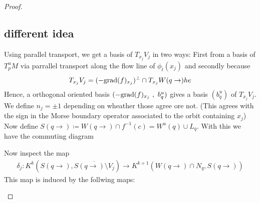 \begin{proof}
 \subsection*{different idea}
 Using parallel transport, we get a basis of $T_{x_j}V_j$ in two ways: First from a basis of $T^u_pM$ via parrallel transport along the flow line of $\phi_t(x_j)$ and secondly because 
  \begin{align*}
     T_{x_j}V_j=(-\mathrm{grad}(f)_{x_j})^{\perp}\cap T_{x_j}W(q\to)
he  \end{align*} Hence, a orthogonal oriented basis $(-\mathrm{grad}(f)_{x_j}~,~b^u_q)$ gives a basis $(b^u_q)$ of $ T_{x_j}V_j$. We define $n_j=\pm1$ depending on wheather those agree ore not. (This agrees with the sign in the Morse boundary operator associated to the orbit containing $x_j$) Now define $S(q\to)\coloneq W(q\to )\cap f^{-1}(c)=W^u(q)\cup L_q$. 
With this we have the commuting diagram
\begin{center}
\end{center}
Now inspect the map 
\begin{align*}
    \delta_j: K^k(S(q\to),\overline{S(q\to)\setminus V_j})\to K^{k+1}(W(q\to)\cap N_q,S(q\to))
\end{align*}
This map is induced by the follwing maps:
\begin{center}

\end{center}
\end{proof}
